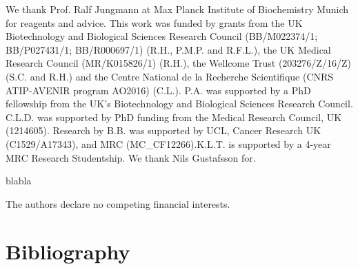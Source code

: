 \begin{acknowledgements}
 We thank Prof. Ralf Jungmann at Max Planck Institute of Biochemistry Munich for reagents and advice. This work was funded by grants from the UK Biotechnology and Biological Sciences Research Council (BB/M022374/1; BB/P027431/1; BB/R000697/1) (R.H., P.M.P. and R.F.L.), the UK Medical Research Council (MR/K015826/1) (R.H.), the Wellcome Trust (203276/Z/16/Z) (S.C. and R.H.) and the Centre National de la Recherche Scientifique (CNRS ATIP-AVENIR program AO2016) (C.L.). P.A. was supported by a PhD fellowship from the UK’s Biotechnology and Biological Sciences Research Council. C.L.D. was supported by PhD funding from the Medical Research Council, UK (1214605). Research by B.B. was supported by UCL, Cancer Research UK (C1529/A17343), and MRC (MC\_CF12266).K.L.T. is supported by a 4-year MRC Research Studentship. We thank Nils Gustafsson for.
\end{acknowledgements}


\begin{contributions}
 blabla
\end{contributions}

\begin{interests}
 The authors declare no competing financial interests.
\end{interests}

\section*{Bibliography}


